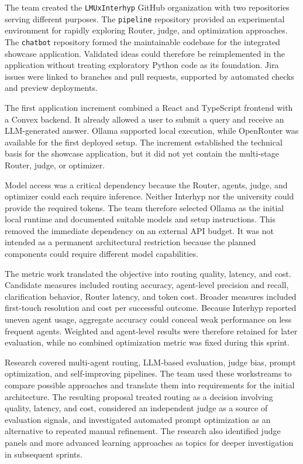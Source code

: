 The team created the \texttt{LMUxInterhyp} GitHub organization with two repositories serving different purposes. The \texttt{pipeline} repository provided an experimental environment for rapidly exploring Router, judge, and optimization approaches. The \texttt{chatbot} repository formed the maintainable codebase for the integrated showcase application. Validated ideas could therefore be reimplemented in the application without treating exploratory Python code as its foundation. Jira issues were linked to branches and pull requests, supported by automated checks and preview deployments.

The first application increment combined a React and TypeScript frontend with a Convex backend. It already allowed a user to submit a query and receive an LLM-generated answer. Ollama supported local execution, while OpenRouter was available for the first deployed setup. The increment established the technical basis for the showcase application, but it did not yet contain the multi-stage Router, judge, or optimizer.

Model access was a critical dependency because the Router, agents, judge, and optimizer could each require inference. Neither Interhyp nor the university could provide the required tokens. The team therefore selected Ollama as the initial local runtime and documented suitable models and setup instructions. This removed the immediate dependency on an external API budget. It was not intended as a permanent architectural restriction because the planned components could require different model capabilities.

The metric work translated the objective into routing quality, latency, and cost. Candidate measures included routing accuracy, agent-level precision and recall, clarification behavior, Router latency, and token cost. Broader measures included first-touch resolution and cost per successful outcome. Because Interhyp reported uneven agent usage, aggregate accuracy could conceal weak performance on less frequent agents. Weighted and agent-level results were therefore retained for later evaluation, while no combined optimization metric was fixed during this sprint.

Research covered multi-agent routing, LLM-based evaluation, judge bias, prompt optimization, and self-improving pipelines. The team used these workstreams to compare possible approaches and translate them into requirements for the initial architecture. The resulting proposal treated routing as a decision involving quality, latency, and cost, considered an independent judge as a source of evaluation signals, and investigated automated prompt optimization as an alternative to repeated manual refinement. The research also identified judge panels and more advanced learning approaches as topics for deeper investigation in subsequent sprints.

